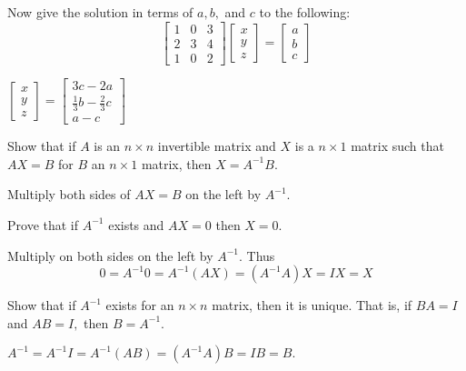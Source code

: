 \documentclass{ximera}
\begin{document}
\begin{problem}
\item Now give the solution in terms of $a,b,$ and $c$ to the following:
\begin{equation*}
\left[
\begin{array}{rrr}
1 & 0 & 3 \\
2 & 3 & 4 \\
1 & 0 & 2
\end{array}
\right] \left[
\begin{array}{c}
x \\
y \\
z
\end{array}
\right] =\left[
\begin{array}{c}
a \\
b \\
c
\end{array}
\right]
\end{equation*}
\begin{hint}
$\left[
\begin{array}{c}
x \\
y \\
z
\end{array}
\right] =
\left[
\begin{array}{c}
3c-2a \\
\frac{1}{3}b-\frac{2}{3}c \\
a-c
\end{array}
\right]$
\end{hint}
\end{problem}

\begin{problem}\label{prb:4.46}Show that if $A$ is an $n\times n$ invertible matrix and $X$
is a $n\times 1$ matrix such that $AX=B$ for $B$ an
$n\times 1$ matrix, then $X=A^{-1}B$.
\begin{hint}
Multiply both sides of $AX=B$ on the left by $A^{-1}$.
\end{hint}
\end{problem}

\begin{problem}\label{prb:4.47}Prove that if $A^{-1}$ exists and $AX=0$ then $X=0$.
\begin{hint}
Multiply on both sides on the left by $A^{-1}.$ Thus
\[
0=A^{-1}0=A^{-1}\left( AX\right) =\left(
A^{-1}A\right) X=IX = X
\]
\end{hint}
\end{problem}

\begin{problem}\label{prb:4.48}
Show that if $A^{-1}$ exists for an $n\times n$
matrix, then it is unique. That is, if $BA=I$ and $AB=I,$ then $B=A^{-1}.$
\begin{hint}
 $A^{-1}=A^{-1}I=A^{-1}\left( AB\right) =\left( A^{-1}A\right) B=IB=B.$
\end{hint}
\end{problem}
\end{document}
